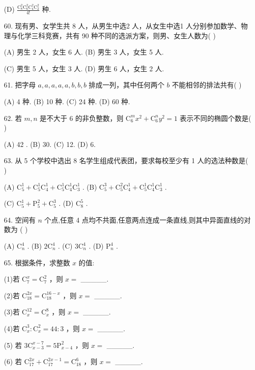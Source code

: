 \documentclass[10pt]{article}
\begin{document}
(D) \(\frac{{\mathrm{C}}_{8}^{2}{\mathrm{C}}_{6}^{2}{\mathrm{C}}_{4}^{2}{\mathrm{C}}_{2}^{2}}{4!}\) 种.

60. 现有男、女学生共 8 人，从男生中选2 人，从女生中选1 人分别参加数学、物理与化学三科竞赛，共有 90 种不同的选派方案，则男、女生人数为( )

(A) 男生 2 人，女生 6 人. (B) 男生 3 人，女生 5 人.

(C) 男生 5 人，女生 3 人. (D) 男生 6 人，女生 2 人.

61. 把字母 \(a,a,a,a,a,b,b,b\) 排成一列，其中任何两个 \(b\) 不能相邻的排法共有( )

(A) 4 种. (B) 10 种. (C) 24 种. (D) 60 种.

62. 若 \(m,n\) 是不大于 6 的非负整数，则 \({\mathrm{C}}_{6}^{m}{x}^{2} + {\mathrm{C}}_{6}^{n}{y}^{2} = 1\) 表示不同的椭圆个数是( )

(A) 42 . (B) 30. (C) 12. (D) 6.

63. 从 5 个学校中选出 8 名学生组成代表团，要求每校至少有 1 人的选法种数是( )

(A) \({\mathrm{C}}_{5}^{1} + {\mathrm{C}}_{5}^{1}{\mathrm{C}}_{4}^{1} + {\mathrm{C}}_{5}^{1}{\mathrm{C}}_{4}^{1}{\mathrm{C}}_{3}^{1}\) . (B) \({\mathrm{C}}_{5}^{3} + {\mathrm{C}}_{5}^{2}{\mathrm{C}}_{4}^{1} + {\mathrm{C}}_{5}^{1}{\mathrm{C}}_{4}^{1}{\mathrm{C}}_{3}^{1}\) .

(C) \({\mathrm{C}}_{5}^{1} + {\mathrm{P}}_{5}^{2} + {\mathrm{C}}_{5}^{3}\) . (D) \({\mathrm{C}}_{8}^{5}\) .

64. 空间有 \(n\) 个点,任意 4 点均不共面,任意两点连成一条直线,则其中异面直线的对数为 ( )

(A) \({\mathrm{C}}_{n}^{4}\) . (B) \(2{\mathrm{C}}_{n}^{4}\) . (C) \(3{\mathrm{C}}_{n}^{4}\) . (D) \({\mathrm{P}}_{n}^{4}\) .

65. 根据条件，求整数 \(x\) 的值:

(1)若 \({\mathrm{C}}_{7}^{x} = {\mathrm{C}}_{7}^{2}\) ，则 \(x =\) \_\_\_\_\_.

(2)若 \({\mathrm{C}}_{18}^{2x} = {\mathrm{C}}_{18}^{{16} - x}\) ，则 \(x =\) \_\_\_\_\_.

(3)若 \({\mathrm{C}}_{x}^{12} = {\mathrm{C}}_{x}^{8}\) ，则 \(x =\) \_\_\_\_\_.

(4)若 \({\mathrm{C}}_{x}^{3} : {\mathrm{C}}_{x}^{2} = {44} : 3\) ，则 \(x =\) \_\_\_\_\_.

(5) 若 \(3{\mathrm{C}}_{x - 3}^{x - 7} = 5{\mathrm{P}}_{x - 4}^{2}\) ，则 \(x =\) \_\_\_\_\_.

(6) 若 \({\mathrm{C}}_{17}^{2x} + {\mathrm{C}}_{17}^{{2x} - 1} = {\mathrm{C}}_{18}^{6}\) ，则 \(x =\) \_\_\_\_\_.
\end{document}
